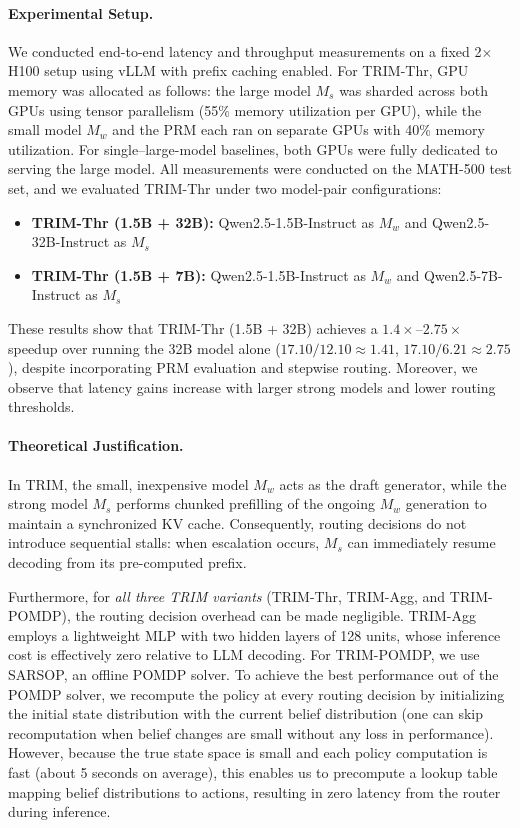 \documentclass{article}
\theoremstyle{plain}
\theoremstyle{definition}
\theoremstyle{remark}
\begin{document}
\paragraph{Experimental Setup.}
We conducted end-to-end latency and throughput measurements on a fixed 2$\times$H100 setup using vLLM with prefix caching enabled. For TRIM-Thr, GPU memory was allocated as follows: the large model $M_s$ was sharded across both GPUs using tensor parallelism (55\% memory utilization per GPU), while the small model $M_w$ and the PRM each ran on separate GPUs with 40\% memory utilization. For single–large-model baselines, both GPUs were fully dedicated to serving the large model. All measurements were conducted on the MATH-500 test set, and we evaluated TRIM-Thr under two model-pair configurations:
\begin{itemize}
    \item \textbf{TRIM-Thr (1.5B + 32B):} Qwen2.5-1.5B-Instruct as $M_w$ and Qwen2.5-32B-Instruct as $M_s$
    \item \textbf{TRIM-Thr (1.5B + 7B):} Qwen2.5-1.5B-Instruct as $M_w$ and Qwen2.5-7B-Instruct as $M_s$
\end{itemize}


These results show that TRIM-Thr (1.5B + 32B) achieves a $1.4\times$--$2.75\times$ speedup over running the 32B model alone ($17.10/12.10 \approx 1.41$, $17.10/6.21 \approx 2.75$), despite incorporating PRM evaluation and stepwise routing. Moreover, we observe that latency gains increase with larger strong models and lower routing thresholds.

\paragraph{Theoretical Justification.}
In TRIM, the small, inexpensive model $M_w$ acts as the draft generator, while the strong model $M_s$ performs chunked prefilling of the ongoing $M_w$ generation to maintain a synchronized KV cache. Consequently, routing decisions do not introduce sequential stalls: when escalation occurs, $M_s$ can immediately resume decoding from its pre-computed prefix.

Furthermore, for \emph{all three TRIM variants} (TRIM-Thr, TRIM-Agg, and TRIM-POMDP), the routing decision overhead can be made negligible. TRIM-Agg employs a lightweight MLP with two hidden layers of 128 units, whose inference cost is effectively zero relative to LLM decoding. For TRIM-POMDP, we use SARSOP, an offline POMDP solver. To achieve the best performance out of the POMDP solver, we recompute the policy at every routing decision by initializing the initial state distribution with the current belief distribution (one can skip recomputation when belief changes are small without any loss in performance). However, because the true state space is small and each policy computation is fast (about 5 seconds on average), this enables us to precompute a lookup table mapping belief distributions to actions, resulting in zero latency from the router during inference.
\end{document}
